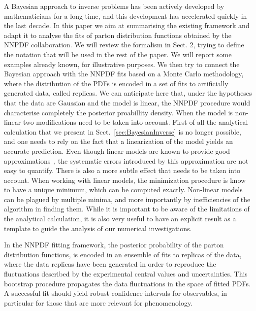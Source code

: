 A Bayesian approach to inverse problems has been actively developed by
mathematicians for a long time, and this development has accelerated quickly in
the last decade. In this paper we aim at summarising the existing framework and
adapt it to analyse the fits of parton distribution functions obtained by the
NNPDF collaboration. We will review the formalism in Sect. 2, trying to define
the notation that will be used in the rest of the paper. We will report some
examples already known, for illustrative purposes. We then try to connect the
Bayesian approach with the NNPDF fits based on a Monte Carlo methodology, where
the distribution of the PDFs is encoded in a set of fits to artificially
generated data, called replicas. We can anticipate here that, under the
hypotheses that the data are Gaussian and the model is linear, the NNPDF
procedure would characterise completely the posterior proabillity density. When
the model is non-linear two modifications need to be taken into account. First
of all the analytical calculation that we present in
Sect.~\ref{sec:BayesianInverse} is no longer possible, and one needs to rely on
the fact that a linearization of the model yields an accurate prediction. Even
though linear models are known to provide good approximations~\cite{xxx}, the
systematic errors introduced by this approximation are not easy to quantify.
There is also a more subtle effect that needs to be taken into account. When
working with linear models, the minimization procedure is know to have a unique
minimum, which can be computed exactly. Non-linear models can be plagued by
multiple minima, and more importantly by inefficiencies of the algorithm in
finding them. While it is important to be aware of the limitations of the
analytical calculation, it is also very useful to have an explicit result as a
template to guide the analysis of our numerical investigations. 

In the NNPDF fitting framework, the posterior probability of the parton
distribution functions, is encoded in an ensemble of fits to replicas of the
data, where the data replicas have been generated in order to reproduce the
fluctuations described by the experimental central values and uncertainties.
This bootstrap procedure propagates the data fluctuations in the space of fitted
PDFs. A successful fit should yield robust confidence intervals for observables,
in particular for those that are more relevant for phenomenology.

